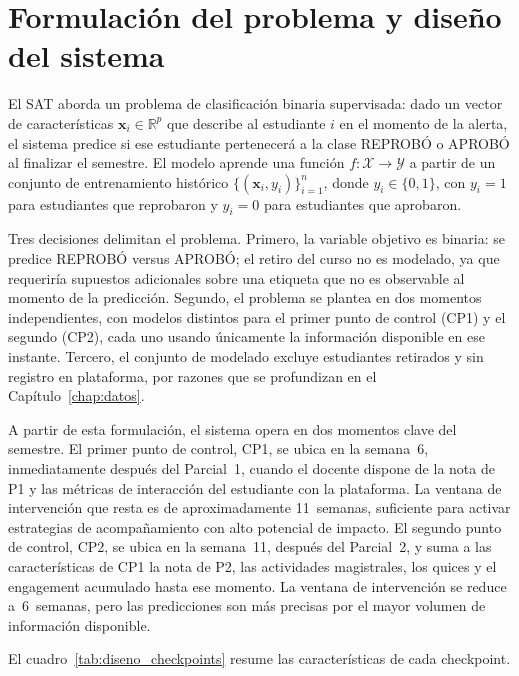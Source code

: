 \documentclass[12pt, letterpaper, openany]{report}
\begin{document}
\section{Formulación del problema y diseño del sistema}

El SAT aborda un problema de clasificación binaria supervisada: dado 
un vector de características $\mathbf{x}_i \in \mathbb{R}^p$ que 
describe al estudiante $i$ en el momento de la alerta, el sistema 
predice si ese estudiante pertenecerá a la clase REPROBÓ o APROBÓ al 
finalizar el semestre. El modelo aprende una función $f\colon \mathcal{X} 
\to \mathcal{Y}$ a partir de un conjunto de entrenamiento histórico 
$\{(\mathbf{x}_i, y_i)\}_{i=1}^{n}$, donde $y_i \in \{0, 1\}$, con 
$y_i = 1$ para estudiantes que reprobaron y $y_i = 0$ para estudiantes 
que aprobaron.

Tres decisiones delimitan el problema. Primero, la variable objetivo 
es binaria: se predice REPROBÓ versus APROBÓ; el retiro del curso no 
es modelado, ya que requeriría supuestos adicionales sobre una etiqueta 
que no es observable al momento de la predicción. Segundo, el problema 
se plantea en dos momentos independientes, con modelos distintos para 
el primer punto de control (CP1) y el segundo (CP2), cada uno usando 
únicamente la información disponible en ese instante. Tercero, el 
conjunto de modelado excluye estudiantes retirados y sin registro en 
plataforma, por razones que se profundizan en el 
Capítulo~\ref{chap:datos}.

A partir de esta formulación, el sistema opera en dos momentos clave 
del semestre. El primer punto de control, CP1, se ubica en la semana~6, 
inmediatamente después del Parcial~1, cuando el docente dispone de 
la nota de P1 y las métricas de interacción del estudiante con la 
plataforma. La ventana de intervención que resta es de aproximadamente 
11~semanas, suficiente para activar estrategias de acompañamiento con 
alto potencial de impacto. El segundo punto de control, CP2, se ubica en la 
semana~11, después del Parcial~2, y suma a las características de CP1 
la nota de P2, las actividades magistrales, los quices y el engagement 
acumulado hasta ese momento. La ventana de intervención se reduce 
a~6~semanas, pero las predicciones son más precisas por el mayor 
volumen de información disponible.

El cuadro~\ref{tab:diseno_checkpoints} resume las características de 
cada checkpoint.
\end{document}

